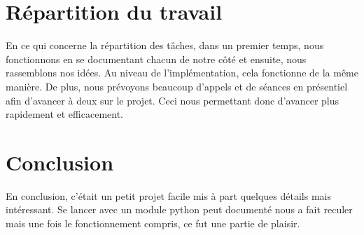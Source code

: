 \section{Répartition du travail}
En ce qui concerne la répartition des tâches, dans un premier temps, nous fonctionnons en se documentant chacun de notre côté et ensuite, nous rassemblons nos idées.
Au niveau de l'implémentation, cela fonctionne de la même manière. 
De plus, nous prévoyons beaucoup d'appels et de séances en présentiel afin d'avancer à deux sur le projet.
Ceci nous permettant donc d'avancer plus rapidement et efficacement.

\section{Conclusion}
En conclusion, c'était un petit projet facile mis à part quelques détails mais intéressant.
Se lancer avec un module python peut documenté nous a fait reculer mais une fois le fonctionnement compris, ce fut une partie de plaisir.
